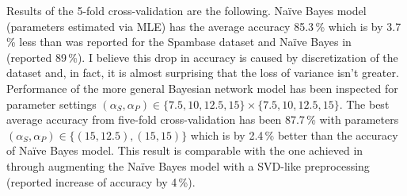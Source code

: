 \documentclass[english,cover]{fitthesis} %
\begin{document}

Results of the 5-fold cross-validation are the following. Naïve Bayes model (parameters estimated via MLE) has the average accuracy 85.3\,\% which is by 3.7\,\% less than was reported for the Spambase dataset and Naïve Bayes in~\cite{renuka11} (reported 89\,\%). I believe this drop in accuracy is caused by discretization of the dataset and, in fact, it is almost surprising that the loss of variance isn't greater. Performance of the more general Bayesian network model has been inspected for parameter settings $(\alpha_S, \alpha_P) \in \lbrace 7.5, 10, 12.5, 15\rbrace \times \lbrace 7.5, 10, 12.5, 15 \rbrace$.
The best average accuracy from five-fold cross-validation has been 87.7\,\% with parameters $(\alpha_S, \alpha_P) \in \lbrace (15, 12.5), (15, 15) \rbrace$ which is by 2.4\,\% better than the accuracy of Naïve Bayes model. This result is comparable with the one achieved in~\cite{renuka11} through augmenting the Naïve Bayes model with a SVD-like preprocessing (reported increase of accuracy by 4\,\%).
\end{document}
